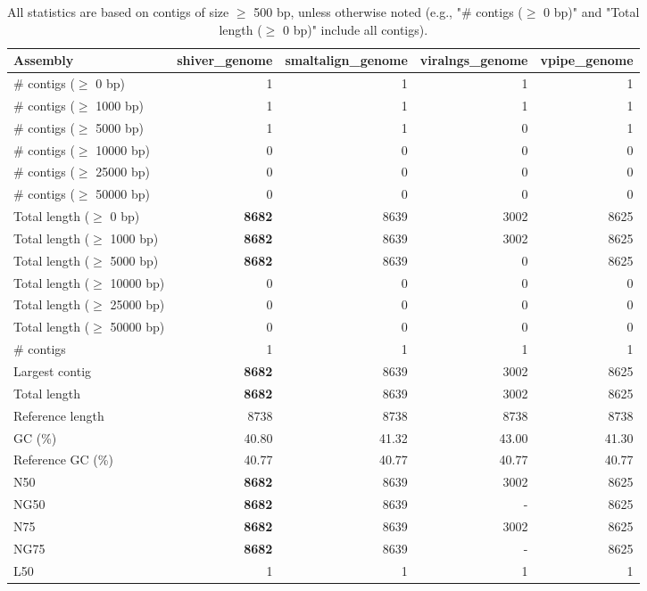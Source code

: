 \documentclass[12pt,a4paper]{article}
\begin{document}
\begin{table}[ht]
\begin{center}
\caption{All statistics are based on contigs of size $\geq$ 500 bp, unless otherwise noted (e.g., "\# contigs ($\geq$ 0 bp)" and "Total length ($\geq$ 0 bp)" include all contigs).}
\begin{tabular}{|l*{4}{|r}|}
\hline
Assembly & shiver\_genome & smaltalign\_genome & viralngs\_genome & vpipe\_genome \\ \hline
\# contigs ($\geq$ 0 bp) & 1 & 1 & 1 & 1 \\ \hline
\# contigs ($\geq$ 1000 bp) & 1 & 1 & 1 & 1 \\ \hline
\# contigs ($\geq$ 5000 bp) & 1 & 1 & 0 & 1 \\ \hline
\# contigs ($\geq$ 10000 bp) & 0 & 0 & 0 & 0 \\ \hline
\# contigs ($\geq$ 25000 bp) & 0 & 0 & 0 & 0 \\ \hline
\# contigs ($\geq$ 50000 bp) & 0 & 0 & 0 & 0 \\ \hline
Total length ($\geq$ 0 bp) & {\bf 8682} & 8639 & 3002 & 8625 \\ \hline
Total length ($\geq$ 1000 bp) & {\bf 8682} & 8639 & 3002 & 8625 \\ \hline
Total length ($\geq$ 5000 bp) & {\bf 8682} & 8639 & 0 & 8625 \\ \hline
Total length ($\geq$ 10000 bp) & 0 & 0 & 0 & 0 \\ \hline
Total length ($\geq$ 25000 bp) & 0 & 0 & 0 & 0 \\ \hline
Total length ($\geq$ 50000 bp) & 0 & 0 & 0 & 0 \\ \hline
\# contigs & 1 & 1 & 1 & 1 \\ \hline
Largest contig & {\bf 8682} & 8639 & 3002 & 8625 \\ \hline
Total length & {\bf 8682} & 8639 & 3002 & 8625 \\ \hline
Reference length & 8738 & 8738 & 8738 & 8738 \\ \hline
GC (\%) & 40.80 & 41.32 & 43.00 & 41.30 \\ \hline
Reference GC (\%) & 40.77 & 40.77 & 40.77 & 40.77 \\ \hline
N50 & {\bf 8682} & 8639 & 3002 & 8625 \\ \hline
NG50 & {\bf 8682} & 8639 & - & 8625 \\ \hline
N75 & {\bf 8682} & 8639 & 3002 & 8625 \\ \hline
NG75 & {\bf 8682} & 8639 & - & 8625 \\ \hline
L50 & 1 & 1 & 1 & 1 \\ \hline

\end{tabular}
\end{center}
\end{table}
\end{document}
